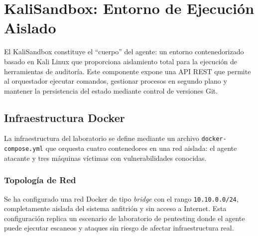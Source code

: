 \clearpage


\section{KaliSandbox: Entorno de Ejecución Aislado}
\label{sec:kalisandbox}

El KaliSandbox constituye el ``cuerpo'' del agente: un entorno contenedorizado basado en Kali Linux que proporciona aislamiento total para la ejecución de herramientas de auditoría. Este componente expone una API REST que permite al orquestador ejecutar comandos, gestionar procesos en segundo plano y mantener la persistencia del estado mediante control de versiones Git.

\subsection{Infraestructura Docker}

La infraestructura del laboratorio se define mediante un archivo \texttt{docker-compose.yml} que orquesta cuatro contenedores en una red aislada: el agente atacante y tres máquinas víctimas con vulnerabilidades conocidas.

\subsubsection{Topología de Red}

Se ha configurado una red Docker de tipo \textit{bridge} con el rango \texttt{10.10.0.0/24}, completamente aislada del sistema anfitrión y sin acceso a Internet. Esta configuración replica un escenario de laboratorio de pentesting donde el agente puede ejecutar escaneos y ataques sin riesgo de afectar infraestructura real.

